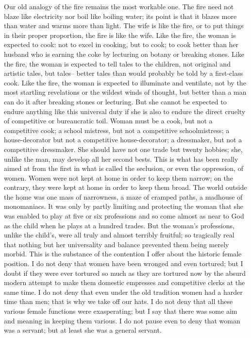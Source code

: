 \documentclass[final,10pt,letterpaper,twocolumn,openany]{book}
\begin{document}
Our old analogy of the fire remains the most workable one. The fire
need not blaze like electricity nor boil like boiling water; its point is that it
blazes more than water and warms more than light. The wife is like the
fire, or to put things in their proper proportion, the fire is like the wife.
Like the fire, the woman is expected to cook: not to excel in cooking, but
to cook; to cook better than her husband who is earning the coke by
lecturing on botany or breaking stones. Like the fire, the woman is
expected to tell tales to the children, not original and artistic tales, but
tales-- better tales than would probably be told by a first-class cook. Like
the fire, the woman is expected to illuminate and ventilate, not by the most
startling revelations or the wildest winds of thought, but better than a man
can do it after breaking stones or lecturing. But she cannot be expected to
endure anything like this universal duty if she is also to endure the direct
cruelty of competitive or bureaucratic toil. Woman must be a cook, but not
a competitive cook; a school mistress, but not a competitive
schoolmistress; a house-decorator but not a competitive house-decorator; a
dressmaker, but not a competitive dressmaker. She should have not one
trade but twenty hobbies; she, unlike the man, may develop all her second
bests. This is what has been really aimed at from the first in what is called
the seclusion, or even the oppression, of women. Women were not kept at
home in order to keep them narrow; on the contrary, they were kept at
home in order to keep them broad. The world outside the home was one
mass of narrowness, a maze of cramped paths, a madhouse of
monomaniacs. It was only by partly limiting and protecting the woman
that she was enabled to play at five or six professions and so come almost
as near to God as the child when he plays at a hundred trades. But the
woman's professions, unlike the child's, were all truly and almost terribly
fruitful; so tragically real that nothing but her universality and balance
prevented them being merely morbid. This is the substance of the
contention I offer about the historic female position. I do not deny that
women have been wronged and even tortured; but I doubt if they were
ever tortured so much as they are tortured now by the absurd modern
attempt to make them domestic empresses and competitive clerks at the
same time. I do not deny that even under the old tradition women had a
harder time than men; that is why we take off our hats. I do not deny that
all these various female functions were exasperating; but I say that there
was some aim and meaning in keeping them various. I do not pause even
to deny that woman was a servant; but at least she was a general servant.
\end{document}
